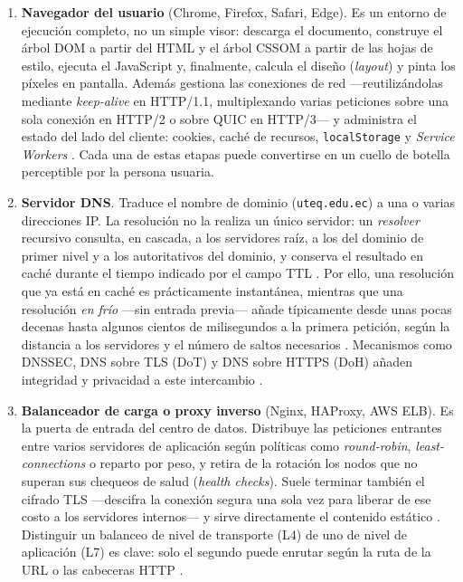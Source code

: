 \begin{enumerate}
	\item \textbf{Navegador del usuario} (Chrome, Firefox, Safari, Edge). Es un entorno de ejecución completo, no un simple visor: descarga el documento, construye el árbol DOM a partir del HTML y el árbol CSSOM a partir de las hojas de estilo, ejecuta el JavaScript y, finalmente, calcula el diseño (\emph{layout}) y pinta los píxeles en pantalla. Además gestiona las conexiones de red ---reutilizándolas mediante \emph{keep-alive} en HTTP/1.1, multiplexando varias peticiones sobre una sola conexión en HTTP/2 o sobre QUIC en HTTP/3--- y administra el estado del lado del cliente: cookies, caché de recursos, \texttt{localStorage} y \textit{Service Workers} \cite{grigorik2013hpbn,rfc9110}. Cada una de estas etapas puede convertirse en un cuello de botella perceptible por la persona usuaria.
	\item \textbf{Servidor DNS}. Traduce el nombre de dominio (\texttt{uteq.edu.ec}) a una o varias direcciones IP. La resolución no la realiza un único servidor: un \emph{resolver} recursivo consulta, en cascada, a los servidores raíz, a los del dominio de primer nivel y a los autoritativos del dominio, y conserva el resultado en caché durante el tiempo indicado por el campo TTL \cite{rfc1034,rfc1035}. Por ello, una resolución que ya está en caché es prácticamente instantánea, mientras que una resolución \emph{en frío} ---sin entrada previa--- añade típicamente desde unas pocas decenas hasta algunos cientos de milisegundos a la primera petición, según la distancia a los servidores y el número de saltos necesarios \cite{grigorik2013hpbn,kurose2021networking}. Mecanismos como DNSSEC, DNS sobre TLS (DoT) y DNS sobre HTTPS (DoH) añaden integridad y privacidad a este intercambio \cite{tanenbaum2021networks}.
	\item \textbf{Balanceador de carga o proxy inverso} (Nginx, HAProxy, AWS ELB). Es la puerta de entrada del centro de datos. Distribuye las peticiones entrantes entre varios servidores de aplicación según políticas como \emph{round-robin}, \emph{least-connections} o reparto por peso, y retira de la rotación los nodos que no superan sus chequeos de salud (\emph{health checks}). Suele terminar también el cifrado TLS ---descifra la conexión segura una sola vez para liberar de ese costo a los servidores internos--- y sirve directamente el contenido estático \cite{rfc8446,kleppmann2017designing}. Distinguir un balanceo de nivel de transporte (L4) de uno de nivel de aplicación (L7) es clave: solo el segundo puede enrutar según la ruta de la URL o las cabeceras HTTP \cite{tanenbaum2021networks}.

\end{enumerate}
